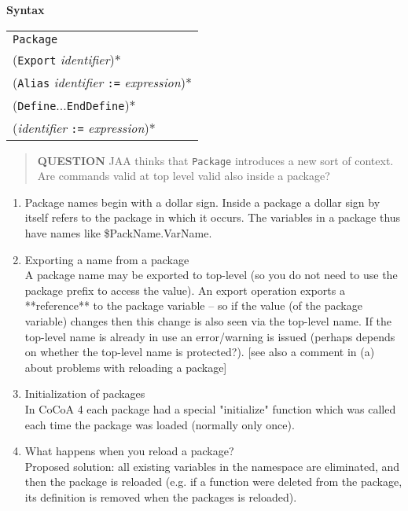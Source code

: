 \documentclass{book}[12,a4paper]
\def\mydots{$...$}
\newenvironment{syntax}
{\goodbreak\noindent\textbf{Syntax}\\
 \begin{tabular}{|p{0.9\textwidth}|}\hline}
{\\\hline\end{tabular}}
\begin{document}
\begin{syntax}
\texttt{Package} \\
(\texttt{Export} \textit{identifier})* \\
(\texttt{Alias} \textit{identifier} \texttt{:=} \textit{expression})* \\
(\texttt{Define}\mydots\texttt{EndDefine})* \\
(\textit{identifier} \texttt{:=} \textit{expression})*
\end{syntax}

\begin{quote}
  {\bf QUESTION} JAA thinks that \texttt{Package} introduces a new sort
of context.  Are commands valid at top level valid also inside a package?
\end{quote}


\begin{enumerate}
\item  Package names begin with a dollar sign.  Inside a package a dollar
  sign by itself refers to the package in which it occurs.  The variables
  in a package thus have names like \$PackName.VarName.
  
\item  Exporting a name from a package\\
  A package name may be exported to top-level (so you do not need to use
  the package prefix to access the value).  An export operation exports
  a **reference** to the package variable -- so if the value (of the package
  variable) changes then this change is also seen via the top-level name.
  If the top-level name is already in use an error/warning is issued
  (perhaps depends on whether the top-level name is protected?).
  [see also a comment in (a) about problems with reloading a package]

\item Initialization of packages  \\
  In CoCoA 4 each package had a special "initialize" function which was
  called each time the package was loaded (normally only once).
  
\item What happens when you reload a package?\\
  Proposed solution:
  all existing variables in the namespace are eliminated, and then
  the package is reloaded (e.g. if a function were deleted from the
  package, its definition is removed when the packages is reloaded).
  
\end{enumerate}
\end{document}
